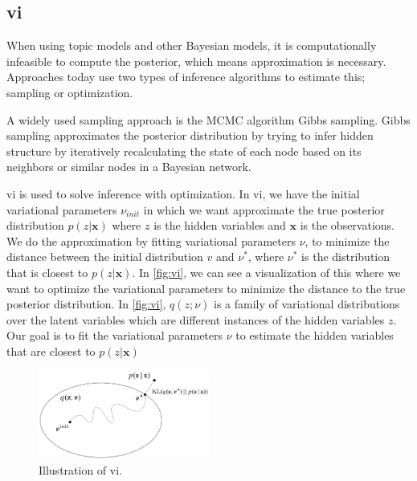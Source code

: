 \subsection{\acrlong{vi}}
When using topic models and other Bayesian models, it is computationally infeasible to compute the posterior, which means approximation is necessary. 
Approaches today use two types of inference algorithms to estimate this; sampling or optimization.

A widely used sampling approach is the MCMC algorithm Gibbs sampling.
Gibbs sampling approximates the posterior distribution by trying to infer hidden structure by iteratively recalculating the state of each node based on its neighbors or similar nodes in a Bayesian network.

\gls{vi} is used to solve inference with optimization.
In \gls{vi}, we have the initial variational parameters $\nu_{init}$ in which we want approximate the true posterior distribution $p(z|\textbf{x})$ where $z$ is the hidden variables and $\textbf{x}$ is the observations.
We do the approximation by fitting variational parameters $\nu$, to minimize the distance between the initial distribution $v$ and $\nu^*$, where $\nu^*$ is the distribution that is closest to $p(z|\textbf{x})$.
In \autoref{fig:vi}, we can see a visualization of this where we want to optimize the variational parameters to minimize the distance to the true posterior distribution.
In \autoref{fig:vi}, $q(z; \nu)$ is a family of variational distributions over the latent variables which are different instances of the hidden variables $z$.
Our goal is to fit the variational parameters $\nu$ to estimate the hidden variables that are closest to $p(z|\textbf{x})$

\begin{figure}
	\centering
	\includegraphics[width=0.5\textwidth]{figures/vi_illustration.png}
	\caption[Caption for LOF]{Illustration of \acrlong{vi}\footnotemark.}
	\label{fig:vi}
\end{figure}

